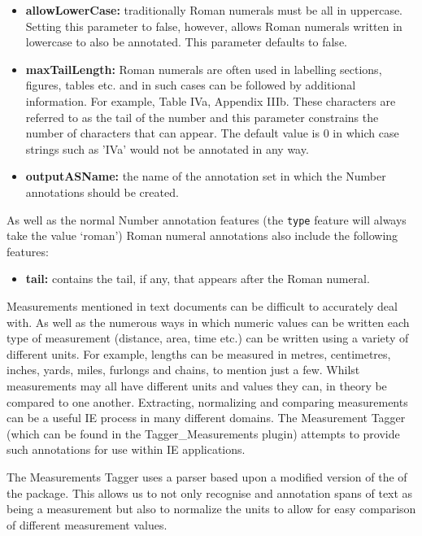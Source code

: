 \begin{itemize}
\item \textbf{allowLowerCase:} traditionally Roman numerals must be all in uppercase. Setting this parameter to false, however, allows Roman numerals written in lowercase
  to also be annotated. This parameter defaults to false.
\item \textbf{maxTailLength:} Roman numerals are often used in labelling sections, figures, tables etc. and in such cases can be followed by additional information. For
  example, Table IVa, Appendix IIIb. These characters are referred to as the tail of the number and this parameter constrains the number of characters that can appear. The default value is 0 in which case strings such as 'IVa' would not be annotated in any way.
\item \textbf{outputASName:} the name of the annotation set in which the Number annotations should be created.
\end{itemize}

As well as the normal Number annotation features (the \texttt{type} feature will
always take the value `roman') Roman numeral annotations also include the
following features:

\begin{itemize}
\item \textbf{tail:} contains the tail, if any, that appears after the Roman numeral.
\end{itemize}


Measurements mentioned in text documents can be difficult to accurately deal
with. As well as the numerous ways in which numeric values can be written each
type of measurement (distance, area, time etc.) can be written using a variety
of different units.
For example, lengths can be measured in metres, centimetres, inches, yards,
miles, furlongs and chains, to mention just a few.
Whilst measurements may all have different units and values they can, in theory
be compared to one another. Extracting, normalizing and comparing measurements
can be a useful IE process in many different domains. The Measurement Tagger
(which can be found in the Tagger\_Measurements plugin) attempts to provide such
annotations for use within IE applications.

The Measurements Tagger uses a parser based upon a modified version of the
 of the
 package. This allows us
to not only recognise and annotation spans of text as being a measurement but
also to normalize the units to allow for easy comparison of different
measurement values.

